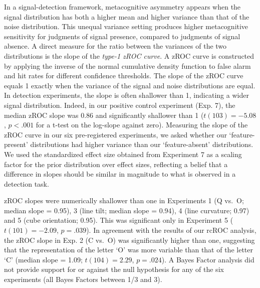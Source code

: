 \documentclass[12pt,twoside]{reedthesis}
\begin{document}
In a signal-detection framework, metacognitive asymmetry appears when the signal distribution has both a higher mean and higher variance than that of the noise distribution. This unequal variance setting produces higher metacognitive sensitivity for judgments of signal presence, compared to judgments of signal absence. A direct measure for the ratio between the variances of the two distributions is the slope of the \emph{type-1 zROC curve}. A zROC curve is constructed by applying the inverse of the normal cumulative density function to false alarm and hit rates for different confidence thresholds. The slope of the zROC curve equals 1 exactly when the variance of the signal and noise distributions are equal. In detection experiments, the slope is often shallower than 1, indicating a wider signal distribution. Indeed, in our positive control experiment (Exp. 7), the median zROC slope was 0.86 and significantly shallower than 1 (\(t(103) = -5.08\), \(p < .001\) for a t-test on the log-slope against zero). Measuring the slope of the zROC curve in our six pre-registered experiments, we asked whether our `feature-present' distributions had higher variance than our `feature-absent' distributions. We used the standardized effect size obtained from Experiment 7 as a scaling factor for the prior distribution over effect sizes, reflecting a belief that a difference in slopes should be similar in magnitude to what is observed in a detection task.

zROC slopes were numerically shallower than one in Experiments 1 (Q vs.~O; median slope = 0.95), 3 (line tilt; median slope = 0.94), 4 (line curvature; 0.97) and 5 (cube orientation; 0.95). This was significant only in Experiment 5 (\(t(101) = -2.09\), \(p = .039\)). In agreement with the results of our rcROC analysis, the zROC slope in Exp. 2 (C vs.~O) was significantly higher than one, suggesting that the representation of the letter `O' was more variable than that of the letter `C' (median slope = 1.09; \(t(104) = 2.29\), \(p = .024\)). A Bayes Factor analysis did not provide support for or against the null hypothesis for any of the six experiments (all Bayes Factors between 1/3 and 3).
\end{document}
